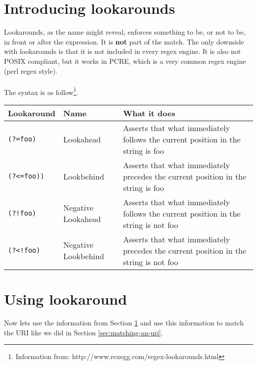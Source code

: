 \section{Introducing lookarounds}
\label{sec:introducing-lookarounds}
Lookarounds, as the name might reveal, enforces something to be, or not to be, in front or after the expression. It is \textbf{not} part of the match. The only downside with lookarounds is that it is not included in every regex engine. It is also not POSIX compliant, but it works in PCRE, which is a very common regex engine (perl regex style).
\\
\\
The syntax is as follow\footnote{Information from: http://www.rexegg.com/regex-lookarounds.html}.\\
\begin{tabular}{l | l || p{5cm}}
Lookaround & Name & What it does \\ \hline
\texttt{(?=foo)} & Lookahead & Asserts that what immediately follows the current position in the string is foo \\ \hline
\texttt{(?<=foo))} & Lookbehind & Asserts that what immediately precedes the current position in the string is foo \\ \hline
\texttt{(?!foo)} & Negative Lookahead & Asserts that what immediately follows the current position in the string is not foo \\ \hline
\texttt{(?<!foo)} & Negative Lookbehind & Asserts that what immediately precedes the current position in the string is not foo \\ \hline
\end{tabular}

\section{Using lookaround}
\label{sec:using-lookaround}
Now lets use the information from Section \ref{sec:introducing-lookarounds} and use this information to match the URI like we did in Section \ref{sec:matching-an-uri}.

